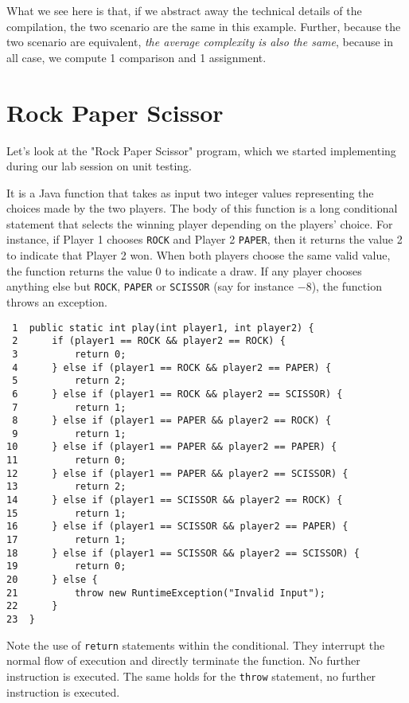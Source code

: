 \documentclass[11pt]{article}
\begin{document}
What we see here is that, if we abstract away the technical details of
the compilation, the two scenario are the same in this
example. Further, because the two scenario are equivalent, \emph{the average
complexity is also the same}, because in all case, we compute 1
comparison and 1 assignment.


\section{Rock Paper Scissor}
\label{sec:org7ffcc4a}

Let's look at the "Rock Paper Scissor" program, which we started
implementing during our lab session on unit testing.

It is a Java function that takes as input two integer values
representing the choices made by the two players. The body of this
function is a long conditional statement that selects the winning player
depending on the players' choice. For instance, if Player 1
chooses \texttt{ROCK} and Player 2 \texttt{PAPER}, then it returns the value 2 to
indicate that Player 2 won. When both players choose the same valid value,
the function returns the value 0 to indicate a draw. If any
player chooses anything else but \texttt{ROCK}, \texttt{PAPER} or \texttt{SCISSOR} (say
for instance \(-8\)), the function throws an exception.

\begin{verbatim}
 1  public static int play(int player1, int player2) {
 2      if (player1 == ROCK && player2 == ROCK) {
 3          return 0;
 4      } else if (player1 == ROCK && player2 == PAPER) {
 5          return 2;
 6      } else if (player1 == ROCK && player2 == SCISSOR) {
 7          return 1;
 8      } else if (player1 == PAPER && player2 == ROCK) {
 9          return 1;
10      } else if (player1 == PAPER && player2 == PAPER) {
11          return 0;
12      } else if (player1 == PAPER && player2 == SCISSOR) {
13          return 2;
14      } else if (player1 == SCISSOR && player2 == ROCK) {
15          return 1;
16      } else if (player1 == SCISSOR && player2 == PAPER) {
17          return 1;
18      } else if (player1 == SCISSOR && player2 == SCISSOR) {
19          return 0;
20      } else {
21          throw new RuntimeException("Invalid Input");
22      }
23  }
\end{verbatim}

Note the use of \texttt{return} statements within the conditional. They
interrupt the normal flow of execution and directly terminate the
function. No further instruction is executed. The same holds for the
\texttt{throw} statement, no further instruction is executed.
\end{document}
